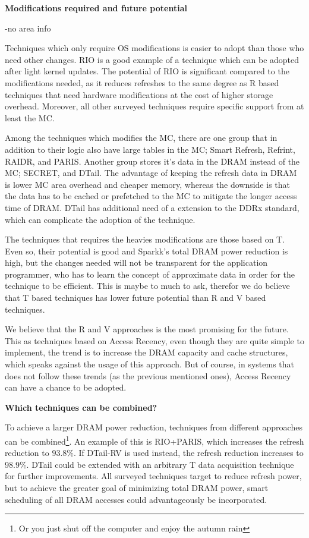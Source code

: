 \textbf{Modifications required and future potential}

-no area info

Techniques which only require OS modifications is easier to adopt than those who need other changes. RIO is a good example of a technique which can be adopted after light kernel updates. The potential of RIO is significant compared to the modifications needed, as it reduces refreshes to the same degree as R based techniques that need hardware modifications at the cost of higher storage overhead. Moreover, all other surveyed techniques require specific support from at least the MC.

Among the techniques which modifies the MC, there are one group that in addition to their logic also have large tables in the MC; Smart Refresh, Refrint, RAIDR, and PARIS. Another group stores it's data in the DRAM instead of the MC; SECRET, and DTail. The advantage of keeping the refresh data in DRAM is lower MC area overhead and cheaper memory, whereas the downside is that the data has to be cached or prefetched to the MC to mitigate the longer access time of DRAM. DTail has additional need of a extension to the DDRx standard, which can complicate the adoption of the technique.

The techniques that requires the heavies modifications are those based on T. Even so, their potential is good and Sparkk's total DRAM power reduction is high, but the changes needed will not be transparent for the application programmer, who has to learn the concept of approximate data in order for the technique to be efficient. This is maybe to much to ask, therefor we do believe that T based techniques has lower future potential than R and V based techniques.

We believe that the R and V approaches is the most promising for the future. This as techniques based on Access Recency, even though they are quite simple to implement, the trend is to increase the DRAM capacity and cache structures, which speaks against the usage of this approach. But of course, in systems that does not follow these trends (as the previous mentioned ones), Access Recency can have a chance to be adopted. 

\textbf{Which techniques can be combined?}

To achieve a larger DRAM power reduction, techniques from different approaches can be combined\footnote{Or you just shut off the computer and enjoy the autumn rain}. An example of this is RIO+PARIS, which increases the refresh reduction to $93.8\%$. If DTail-RV is used instead, the refresh reduction increases to $98.9\%$. DTail could be extended with an arbitrary T data acquisition technique for further improvements. All surveyed techniques target to reduce refresh power, but to achieve the greater goal of minimizing total DRAM power, smart scheduling of all DRAM accesses could advantageously be incorporated. 

